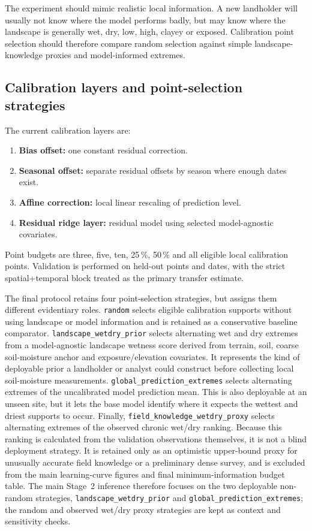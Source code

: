 \documentclass[11pt,a4paper]{article}
\begin{document}
The experiment should mimic realistic local information.  A new landholder
will usually not know where the model performs badly, but may know where the
landscape is generally wet, dry, low, high, clayey or exposed.  Calibration
point selection should therefore compare random selection against simple
landscape-knowledge proxies and model-informed extremes.

\subsection{Calibration layers and point-selection strategies}
\label{sec:stage2-methods}

The current calibration layers are:

\begin{enumerate}
\item \textbf{Bias offset:} one constant residual correction.
\item \textbf{Seasonal offset:} separate residual offsets by season where
  enough dates exist.
\item \textbf{Affine correction:} local linear rescaling of prediction level.
\item \textbf{Residual ridge layer:} residual model using selected model-agnostic
  covariates.
\end{enumerate}

Point budgets are three, five, ten, 25\,\%, 50\,\% and all eligible local
calibration points.  Validation is performed on held-out points and dates, with
the strict spatial+temporal block treated as the primary transfer estimate.

The final protocol retains four point-selection strategies, but assigns them
different evidentiary roles.  \texttt{random} selects eligible calibration
supports without using landscape or model information and is retained as a
conservative baseline comparator.  \texttt{landscape\_wetdry\_prior} selects
alternating wet and dry extremes from a model-agnostic landscape wetness score
derived from terrain, soil, coarse soil-moisture anchor and exposure/elevation
covariates.  It represents the kind of deployable prior a landholder or analyst
could construct before collecting local soil-moisture measurements.
\texttt{global\_prediction\_extremes} selects alternating extremes of the
uncalibrated model prediction mean.  This is also deployable at an unseen site,
but it lets the base model identify where it expects the wettest and driest
supports to occur.  Finally, \texttt{field\_knowledge\_wetdry\_proxy} selects
alternating extremes of the observed chronic wet/dry ranking.  Because this
ranking is calculated from the validation observations themselves, it is not a
blind deployment strategy.  It is retained only as an optimistic upper-bound
proxy for unusually accurate field knowledge or a preliminary dense survey, and
is excluded from the main learning-curve figures and final minimum-information
budget table.  The main Stage~2 inference therefore focuses on the two
deployable non-random strategies, \texttt{landscape\_wetdry\_prior} and
\texttt{global\_prediction\_extremes}; the random and observed wet/dry proxy
strategies are kept as context and sensitivity checks.
\end{document}
